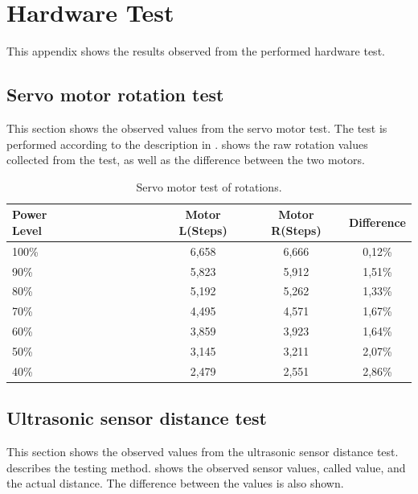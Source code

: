 \chapter{Hardware Test} \label{app:hardware_test}
This appendix shows the results observed from the performed hardware test.

\section*{Servo motor rotation test} \label{app:servo_motor_test}
This section shows the observed values from the servo motor test. The test is performed according to the description in .  shows the raw rotation values collected from the test, as well as the difference between the two motors. 

\begin{table}[H]
	\centering
    \begin{tabular}{lccc}
    \hline  
    \rowcolor{DGray}
    \textbf{Power Level}~~~~~~~~~~~~ & Motor L(Steps) & Motor R(Steps) & Difference \\ \hline 
    100\%                  & 6,658                  & 6,666                & 0,12\% \\
    90\%                   & 5,823                  & 5,912                & 1,51\% \\
    80\%                   & 5,192                  & 5,262                & 1,33\% \\
    70\%                   & 4,495                  & 4,571                & 1,67\% \\
    60\%                   & 3,859                  & 3,923                & 1,64\% \\
    50\%                   & 3,145                  & 3,211                & 2,07\% \\
    40\%                   & 2,479                  & 2,551                & 2,86\% \\
    \hline  
    \end{tabular}
    \caption{\label{table:app_motor_test}Servo motor test of rotations.}
\end{table}

\newpage
\section*{Ultrasonic sensor distance test} \label{app:ultrasonic_sensor_test}
This section shows the observed values from the ultrasonic sensor distance test.  describes the testing method.  shows the observed sensor values, called value, and the actual distance. The difference between the values is also shown. 

